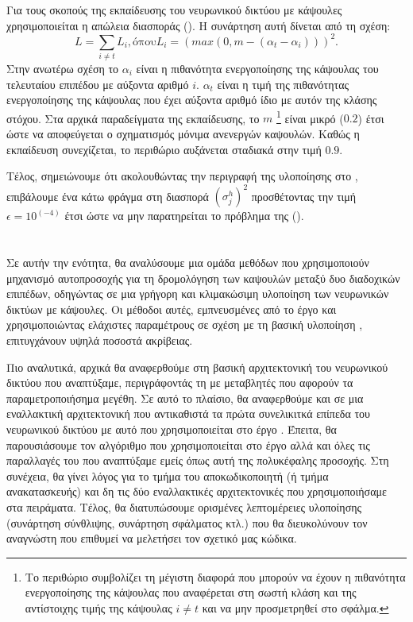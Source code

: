Για τους σκοπούς της εκπαίδευσης του νευρωνικού δικτύου με κάψουλες χρησιμοποιείται η απώλεια διασποράς (). Η συνάρτηση αυτή δίνεται από τη σχέση:
\begin{equation}
  L = \sum_{i\neq t} L_i, \text{όπου} L_i = (max(0, m - (\alpha_t - \alpha_i)))^2.
\end{equation}
Στην ανωτέρω σχέση το $\alpha_i$ είναι η πιθανότητα ενεργοποίησης της κάψουλας του τελευταίου επιπέδου με αύξοντα αριθμό $i$. $\alpha_t$ είναι η τιμή της πιθανότητας ενεργοποίησης της κάψουλας που έχει αύξοντα αριθμό ίδιο με αυτόν της κλάσης στόχου. Στα αρχικά παραδείγματα της εκπαίδευσης, το  $m$ \footnote{Το περιθώριο συμβολίζει τη μέγιστη διαφορά που μπορούν να έχουν η πιθανότητα ενεργοποίησης της κάψουλας που αναφέρεται στη σωστή κλάση και της αντίστοιχης τιμής της κάψουλας $i \neq t$ και να μην προσμετρηθεί στο σφάλμα.} είναι μικρό ($0.2$) έτσι ώστε να αποφεύγεται ο σχηματισμός μόνιμα ανενεργών καψουλών. Καθώς η εκπαίδευση συνεχίζεται, το περιθώριο αυξάνεται σταδιακά στην τιμή $0.9$.\par

Τέλος, σημειώνουμε ότι ακολουθώντας την περιγραφή της υλοποίησης στο \cite{gritzman2019avoiding}, επιβάλουμε ένα κάτω φράγμα στη διασπορά $(\sigma_j^h)^2$ προσθέτοντας την τιμή $\epsilon = 10^(-4)$ έτσι ώστε να μην παρατηρείται το πρόβλημα της  ().


\section{}
\label{sec:method_3}

Σε αυτήν την ενότητα, θα αναλύσουμε μια ομάδα μεθόδων που χρησιμοποιούν μηχανισμό αυτο\textendash προσοχής για τη δρομολόγηση των καψουλών μεταξύ δυο διαδοχικών επιπέδων, οδηγώντας σε μια γρήγορη και κλιμακώσιμη υλοποίηση των νευρωνικών δικτύων με κάψουλες. Οι μέθοδοι αυτές, εμπνευσμένες από το έργο \cite{mazzia2021efficient} και χρησιμοποιώντας ελάχιστες παραμέτρους σε σχέση με τη βασική υλοποίηση \cite{sabour2017dynamic}, επιτυγχάνουν υψηλά ποσοστά ακρίβειας. \par

Πιο αναλυτικά, αρχικά θα αναφερθούμε στη βασική αρχιτεκτονική του νευρωνικού δικτύου που αναπτύξαμε, περιγράφοντάς τη με μεταβλητές που αφορούν τα παραμετροποιήσημα μεγέθη. Σε αυτό το πλαίσιο, θα αναφερθούμε και σε μια εναλλακτική αρχιτεκτονική που αντικαθιστά τα πρώτα συνελικιτκά επίπεδα του νευρωνικού δικτύου με αυτό που χρησιμοποιείται στο έργο \cite{sabour2017dynamic}. Έπειτα, θα παρουσιάσουμε τον αλγόριθμο που χρησιμοποιείται στο έργο \cite{mazzia2021efficient} αλλά και όλες τις παραλλαγές του που αναπτύξαμε εμείς όπως αυτή της πολυκέφαλης προσοχής. Στη συνέχεια, θα γίνει λόγος για το τμήμα του αποκωδικοποιητή (ή τμήμα ανακατασκευής) και δη τις δύο εναλλακτικές αρχιτεκτονικές που χρησιμοποιήσαμε στα πειράματα. Τέλος, θα διατυπώσουμε ορισμένες λεπτομέρειες υλοποίησης (συνάρτηση σύνθλιψης, συνάρτηση σφάλματος κτλ.) που θα διευκολύνουν τον αναγνώστη που επιθυμεί να μελετήσει τον σχετικό μας κώδικα.\par

